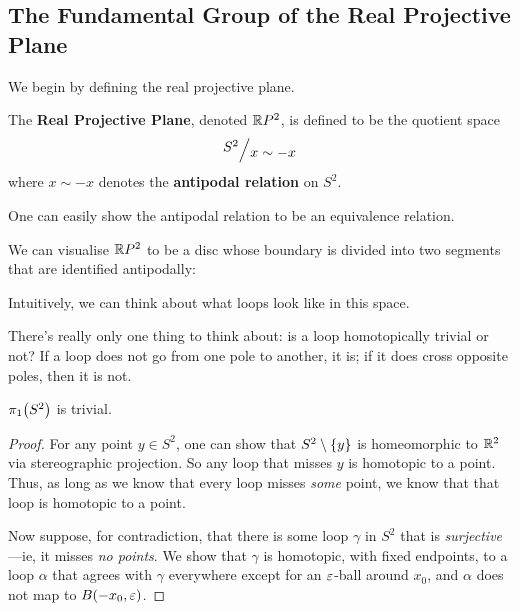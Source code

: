 


\subsection{The Fundamental Group of the Real Projective Plane}

We begin by defining the real projective plane.

\begin{boxdefinition}
    The \textbf{Real Projective Plane}, denoted $\mathbb{R} P^2$, is defined to be the quotient space
    \begin{align*}
        \quotient{S^2}{x \sim -x}
    \end{align*}
    where $x \sim -x$ denotes the \textbf{antipodal relation} on $S^2$.
\end{boxdefinition}

One can easily show the antipodal relation to be an equivalence relation.

We can visualise $\mathbb{R} P^2$ to be a disc whose boundary is divided into two segments that are identified antipodally: \sorry{}

Intuitively, we can think about what loops look like in this space.

There's really only one thing to think about: is a loop homotopically trivial or not? If a loop does not go from one pole to another, it is; if it does cross opposite poles, then it is not.

\begin{boxlemma}
    $\pi_1\!\left( S^2 \right)$ is trivial.
\end{boxlemma}
\begin{proof}
    For any point $y \in S^2$, one can show that $S^2 \setminus \left\{ y \right\}$ is homeomorphic to $\mathbb{R}^2$ via stereographic projection. So any loop that misses $y$ is homotopic to a point. Thus, as long as we know that every loop misses \textit{some} point, we know that that loop is homotopic to a point.

    Now suppose, for contradiction, that there is some loop $\gamma$ in $S^2$ that is \textit{surjective}---ie, it misses \textit{no points}. We show that $\gamma$ is homotopic, with fixed endpoints, to a loop $\alpha$ that agrees with $\gamma$ everywhere except for an $\varepsilon$-ball around $x_0$, and $\alpha$ does not map to $B\!\left( -x_0, \varepsilon \right)$.
    
    \sorry
\end{proof}